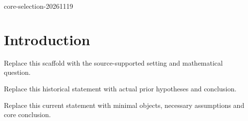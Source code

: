 \def\IntroExpectedRelease{core-selection-20261119}

\ifdefined\IntroRelease
  \edef\IntroActualRelease{\IntroRelease}
  \ifx\IntroActualRelease\IntroExpectedRelease
  \else
    \PackageError{intro-v13}{Release mismatch}{Use the matching release.}
  \fi
\else
  \PackageError{intro-v13}{Missing profile release identity}{Use the matching release.}
\fi

\section{Introduction}
\begin{introparagraph}
Replace this scaffold with the source-supported setting and mathematical question.
\end{introparagraph}
\begin{historical}
Replace this historical statement with actual prior hypotheses and conclusion.
\end{historical}
\begin{resultgroup}
\begin{theorem}
Replace this current statement with minimal objects, necessary assumptions and core conclusion.
\end{theorem}
\end{resultgroup}
